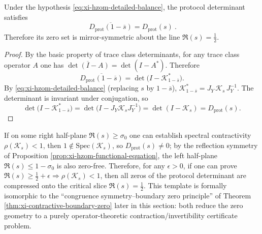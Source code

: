 \begin{proposition}[Detailed balance conjugation \texorpdfstring{$\Rightarrow$}{=>} determinant reflection symmetry]\label{prop:xi-hzom-functional-equation}
Under the hypothesis \eqref{eq:xi-hzom-detailed-balance}, the protocol determinant satisfies
\[
\boxed{\ \overline{D_{\mathrm{prot}}(1-\overline{s})}=D_{\mathrm{prot}}(s)\ }.
\]
Therefore its zero set is mirror-symmetric about the line \(\Re(s)=\tfrac12\).
\end{proposition}

\begin{proof}
By the basic property of trace class determinants, for any trace class operator \(A\) one has \(\overline{\det(I-A)}=\det(I-A^{*})\).
Therefore
\[
\overline{D_{\mathrm{prot}}(1-\overline{s})}
=\det\!\bigl(I-\mathcal{K}_{1-\overline{s}}^{*}\bigr).
\]
By \eqref{eq:xi-hzom-detailed-balance} (replacing \(s\) by \(1-\overline{s}\)),
\(
\mathcal{K}_{1-\overline{s}}^{*}=J_Y\,\mathcal{K}_{s}\,J_Y^{-1}
\).
The determinant is invariant under conjugation, so
\[
\det\!\bigl(I-\mathcal{K}_{1-\overline{s}}^{*}\bigr)
=
\det\!\bigl(I-J_Y\mathcal{K}_sJ_Y^{-1}\bigr)
=
\det(I-\mathcal{K}_s)
=D_{\mathrm{prot}}(s).
\]
\qedhere
\end{proof}

\begin{remark}\label{rem:xi-hzom-contraction-template}
If on some right half-plane \(\Re(s)\ge \sigma_0\) one can establish spectral contractivity \(\rho(\mathcal{K}_s)<1\), then \(1\notin\mathrm{Spec}(\mathcal{K}_s)\), so \(D_{\mathrm{prot}}(s)\neq 0\);
by the reflection symmetry of Proposition \ref{prop:xi-hzom-functional-equation}, the left half-plane \(\Re(s)\le 1-\sigma_0\) is also zero-free.
Therefore, for any \(\epsilon>0\), if one can prove
\(
\Re(s)\ge \tfrac12+\epsilon\Rightarrow \rho(\mathcal{K}_s)<1
\),
then all zeros of the protocol determinant are compressed onto the critical slice \(\Re(s)=\tfrac12\).
This template is formally isomorphic to the ``congruence symmetry--boundary zero principle'' of Theorem \ref{thm:xi-contractive-boundary-zero} later in this section: both reduce the zero geometry to a purely operator-theoretic contraction/invertibility certificate problem.
\end{remark}

